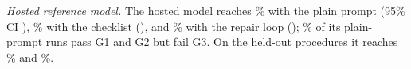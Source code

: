 \textit{Hosted reference model.} The hosted model reaches \HostedPlainEquiv\% with the plain prompt (95\% CI \HostedPlainCI), \HostedTrapEquiv\% with the checklist (\HostedTrapCI), and \HostedAgenticEquiv\% with the repair loop (\HostedAgenticCI); \HostedPlainSilent\% of its plain-prompt runs pass G1 and G2 but fail G3. On the held-out procedures it reaches \HostedHeldoutPlain\% and \HostedHeldoutAgentic\%.
